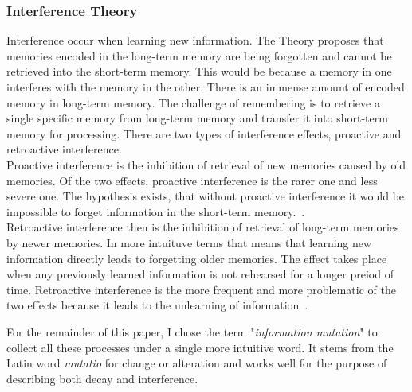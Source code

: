 \subsubsection{Interference Theory}
Interference occur when learning new information. The Theory proposes that memories encoded in the long-term memory are being forgotten and cannot be retrieved into the short-term memory. This would be because a memory in one interferes with the memory in the other. There is an immense amount of encoded memory in long-term memory. The challenge of remembering is to retrieve a single specific  memory from long-term memory and transfer it into short-term memory for processing. There are two types of interference effects, proactive and retroactive interference.~\cite{Edwards2010}\\
Proactive interference is the inhibition of retrieval of new memories caused by old memories. Of the two effects, proactive interference is the rarer one and less severe one. The hypothesis exists, that without proactive interference it would be impossible to forget information in the short-term memory.~\cite{Keppel1962}.\\
Retroactive interference then is the inhibition of retrieval of long-term memories by newer memories. In more intuituve terms that means that learning new information directly leads to forgetting older memories. The effect takes place when any previously learned information is not rehearsed for a longer preiod of time. Retroactive interference is the more frequent and more problematic of the two effects because it leads to the unlearning of information~\cite{Melton1941}.~\cite{Edwards2010}\newline

For the remainder of this paper, I chose the term "\textit{information mutation}" to collect all these processes under a single more intuitive word. It stems from the Latin word \textit{mutatio} for change or alteration and works well for the purpose of describing both decay and interference. 
